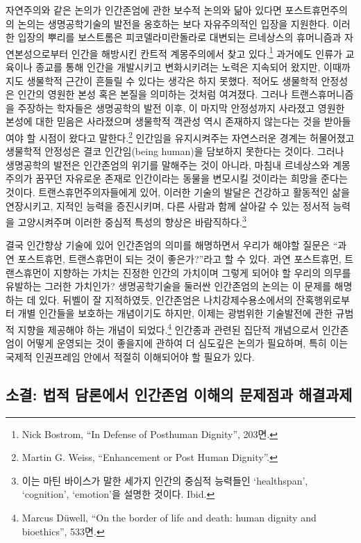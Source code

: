 자연주의와 같은 논의가 인간존엄에 관한 보수적 논의와 닮아 있다면 포스트휴먼주의의 논의는 생명공학기술의 발전을 옹호하는 보다 자유주의적인 입장을 지원한다. 이러한 입장의 뿌리를 보스트롬은 피코델라미란돌라로 대변되는 르네상스의 휴머니즘과 자연본성으로부터 인간을 해방시킨 칸트적 계몽주의에서 찾고 있다.\footnote{Nick Bostrom, ``In Defense of Posthuman Dignity'', 203면.} 과거에도 인류가 교육이나 종교를 통해 인간을 개발시키고 변화시키려는 노력은 지속되어 왔지만, 이때까지도 생물학적 근간이 흔들릴 수 있다는 생각은 하지 못했다. 적어도 생물학적 안정성은 인간의 영원한 본성 혹은 본질을 의미하는 것처럼 여겨졌다. 그러나 트랜스휴머니즘을 주장하는 학자들은 생명공학의 발전 이후, 이 마지막 안정성까지 사라졌고 영원한 본성에 대한 믿음은 사라졌으며 생물학적 객관성 역시 존재하지 않는다는 것을 받아들여야 할 시점이 왔다고 말한다.\footnote{Martin G. Weiss, ``Enhancement or Post Human Dignity''.} 인간임을 유지시켜주는 자연스러운 경계는 허물어졌고 생물학적 안정성은 결코 인간임(being human)을 담보하지 못한다는 것이다. 그러나 생명공학의 발전은 인간존엄의 위기를 말해주는 것이 아니라, 마침내 르네상스와 계몽주의가 꿈꾸던 자유로운 존재로 인간이라는 동물을 변모시킬 것이라는 희망을 준다는 것이다. 트랜스휴먼주의자들에게 있어, 이러한 기술의 발달은 건강하고 활동적인 삶을 연장시키고, 지적인 능력을 증진시키며, 다른 사람과 함께 살아갈 수 있는 정서적 능력을 고양시켜주며 이러한 중심적 특성의 향상은 바람직하다.\footnote{이는 마틴 바이스가 말한 세가지 인간의 중심적 능력들인 `healthspan', `cognition', `emotion'을 설명한 것이다. Ibid.}

결국 인간향상 기술에 있어 인간존엄의 의미를 해명하면서 우리가 해야할 질문은 ``과연 포스트휴먼, 트랜스휴먼이 되는 것이 좋은가?''라고 할 수 있다. 과연 포스트휴먼, 트랜스휴먼이 지향하는 가치는 진정한 인간의 가치이며 그렇게 되어야 할 우리의 의무를 유발하는 그러한 가치인가? 생명공학기술을 둘러싼 인간존엄의 논의는 이 문제를 해명하는 데 있다. 뒤벨이 잘 지적하였듯, 인간존엄은 나치강제수용소에서의 잔혹행위로부터 개별 인간들을 보호하는 개념이기도 하지만, 이제는 광범위한 기술발전에 관한 규범적 지향을 제공해야 하는 개념이 되었다.\footnote{Marcus Düwell, ``On the border of life and death: human dignity and bioethics'', 533면.} 인간종과 관련된 집단적 개념으로서 인간존엄이 어떻게 운영되는 것이 좋을지에 관하여 더 심도깊은 논의가 필요하며, 특히 이는 국제적 인권프레임 안에서 적절히 이해되어야 할 필요가 있다.

\subsection{소결: 법적 담론에서 인간존엄 이해의 문제점과 해결과제}

